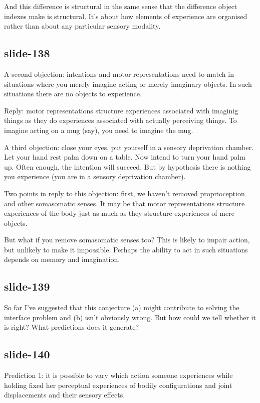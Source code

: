 \documentclass[12pt,\papersize]{extarticle}
\begin{document}
And this difference is structural in the same sense that the difference object indexes make
is structural. It’s about how elements of experience are organised rather than about any
particular sensory modality.
 
\subsection{slide-138}
A second objection: intentions and motor representations need to match in situations where
you merely imagine acting or merely imaginary objects. In such situations there are no objects
to experience.
 
Reply: motor representations structure experiences associated with imaginig things as they do
experiences associated with actually perceiving things. To imagine acting on a mug (say), you need
to imagine the mug.
 
A third objection: close your eyes, put yourself in a sensory deprivation chamber.
Let your hand rest palm down on a table.
Now intend to turn your hand palm up.
Often enough, the intention will succeed.
But by hypothesis there is nothing you experience (you are in a sensory deprivation chamber).
 
Two points in reply to this objection: first, we haven’t removed proprioception and other
somasomatic senses. It may be that motor representations structure experiences of the body
just as much as they structure experiences of mere objects.
 
But what if you remove somasomatic senses too? This is likely to impair action, but unlikely
to make it impossible. Perhaps the ability to act in such situations depends on memory and
imagination.
 
\subsection{slide-139}
So far I’ve suggested that this conjecture (a) might contribute to solving the interface
problem and (b) isn’t obviously wrong. But how could we tell whether it is right?
What predictions does it generate?
 
\subsection{slide-140}
Prediction 1: it is possible to vary which action someone experiences while holding fixed her
perceptual experiences of bodily configurations and joint displacements and their sensory effects.
 
\end{document}
